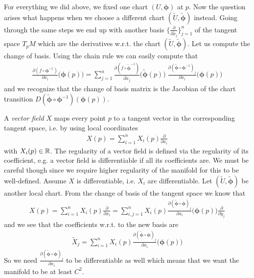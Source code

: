 \documentclass[../master_thesis.tex]{subfiles}
\begin{document}
For everything we did above, we fixed one chart $(U,\boldsymbol{\phi})$ at $p$.
Now the question arises what happens when we choose a different chart 
$(\tilde{U}, \tilde{\boldsymbol{\phi}})$ instead.
Going through the same steps we end up with another basis 
$\{ \frac{\partial}{\partial \tilde{x}_j} \}_{j=1}^n$ of the tangent space $T_p M$
which are the derivatives w.r.t. the chart 
$(\tilde{U}, \tilde{\boldsymbol{\phi}})$. 
Let us compute the change of basis.
Using the chain rule 
we can easily compute that 
\begin{align*}
    \frac{\partial (f \circ \boldsymbol{\phi}^{-1})}{\partial x_i} \big(\boldsymbol{\phi}(p)\big)
    =\sum_{j=1}^n \frac{\partial (f \circ \tilde{\boldsymbol{\phi}}^{-1})}{\partial \tilde{x}_j} 
        \big(\tilde{\boldsymbol{\phi}}(p) \big) \;
        \frac{\partial (\tilde{\boldsymbol{\phi}} \circ \boldsymbol{\phi}^{-1})_j}{\partial x_i}
        \big(\boldsymbol{\phi}(p)\big) 
\end{align*}
and we recognize that the change of basis matrix is the Jacobian of 
the chart transition $D(\tilde{\bm{\phi}} \circ \boldsymbol{\phi}^{-1})(\boldsymbol{\phi}(p))$.

A \textit{vector field} $X$ maps every point $p$ to a tangent vector 
in the corresponding tangent space, i.e. by using local coordinates
\begin{align*}
    X(p) = \sum_{i=1}^n X_i(p) \frac{\partial}{\partial x_i}
\end{align*}
with $X_i(p) \in \mathbb{R}$. The regularity of a vector field is defined via the
regularity of its coefficient, e.g. a vector field is differentiable if 
all its coefficients are. We must be careful though since we require higher 
regularity of the manifold for this to be well-defined. 
Assume $X$ is differentiable, i.e. $X_i$ are differentiable. 
Let $(\tilde{U}, \tilde{\bm{\phi}})$ 
be another local chart.
From the 
change of basis of the tangent space we know that 
\begin{align*}
    X(p) = \sum_{i=1}^n X_i(p) \frac{\partial}{\partial x_i}
    = \sum_{i,j=1}^n X_i(p) \frac{\partial (\tilde{\boldsymbol{\phi}} 
        \circ \boldsymbol{\phi})_j}{\partial x_i}\big(\boldsymbol{\phi}(p)\big)
        \frac{\partial}{\partial y_j}
\end{align*}
and we see that the coefficients w.r.t. to the new basis are 
\begin{align*}
    \tilde{X}_j = \sum_{i=1}^n X_i(p) \frac{\partial (\tilde{\boldsymbol{\phi}} 
    \circ \boldsymbol{\phi})_j}{\partial x_i}\big(\boldsymbol{\phi}(p)\big)        
\end{align*}
So we need $\frac{\partial (\tilde{\boldsymbol{\phi}} \circ \boldsymbol{\phi})_j}{\partial x_i}$ to be 
differentiable as well which means that we want the manifold to be at least $C^2$.
\end{document}
